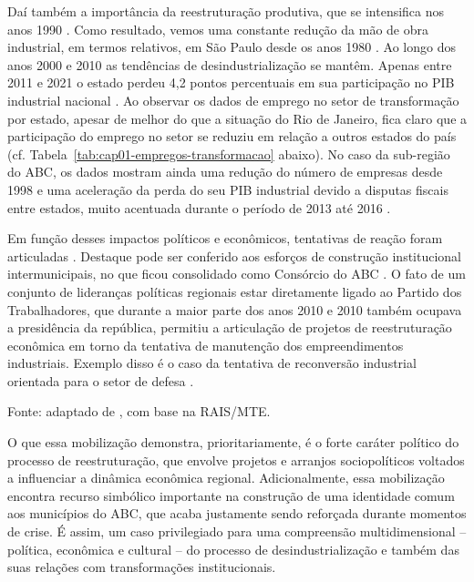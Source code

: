Daí também a importância da reestruturação produtiva, que se intensifica
nos anos 1990 \citep{ramalhorodrigues2013}. Como resultado, vemos uma constante redução da mão
de obra industrial, em termos relativos, em São Paulo desde os anos 1980
\citep{sobral2016}. Ao
longo dos anos 2000 e 2010 as tendências de desindustrialização se
mantêm. Apenas entre 2011 e 2021 o estado perdeu 4,2 pontos percentuais
em sua participação no PIB industrial nacional
\citep{cni_sd}. Ao
observar os dados de emprego no setor de transformação por estado,
apesar de melhor do que a situação do Rio de Janeiro, fica claro que a
participação do emprego no setor se reduziu em relação a outros estados
do país \citep{sobral2016} (cf. Tabela~\ref{tab:cap01-empregos-transformacao} abaixo). No caso da sub-região do ABC, os dados
mostram ainda uma redução do número de empresas desde 1998
\citep{smabc2004} e uma
aceleração da perda do seu PIB industrial devido a disputas fiscais
entre estados, muito acentuada durante o período de 2013 até 2016
\citep{valoreconomico2019}.

Em função desses impactos políticos e econômicos, tentativas de reação
foram articuladas
\citep{reis2007}.
Destaque pode ser conferido aos esforços de construção institucional
intermunicipais, no que ficou consolidado como Consórcio do ABC
\citep{ramalhorodrigues2010,ramalhorodrigues2013}. O fato de um conjunto de lideranças políticas regionais
estar diretamente ligado ao Partido dos Trabalhadores, que durante a
maior parte dos anos 2010 e 2010 também ocupava a presidência da
república, permitiu a articulação de projetos de reestruturação
econômica em torno da tentativa de manutenção dos empreendimentos
industriais. Exemplo disso é o caso da tentativa de reconversão
industrial orientada para o setor de defesa
\citep{ramalhoconceicao2024}.

\begin{table}[htbp]
\centering
\caption{Empregos no setor de transformação entre 1985 e 2012 em estados selecionados}
\label{tab:cap01-empregos-transformacao}
\end{table}

Fonte: adaptado de \citet[p.~198]{sobral2016}, com base na RAIS/MTE.

O que essa mobilização demonstra, prioritariamente, é o forte caráter
político do processo de reestruturação, que envolve projetos e arranjos
sociopolíticos voltados a influenciar a dinâmica econômica regional.
Adicionalmente, essa mobilização encontra recurso simbólico importante
na construção de uma identidade comum aos municípios do ABC, que acaba
justamente sendo reforçada durante momentos de crise. É assim, um caso
privilegiado para uma compreensão multidimensional -- política,
econômica e cultural -- do processo de desindustrialização e também das
suas relações com transformações institucionais.

